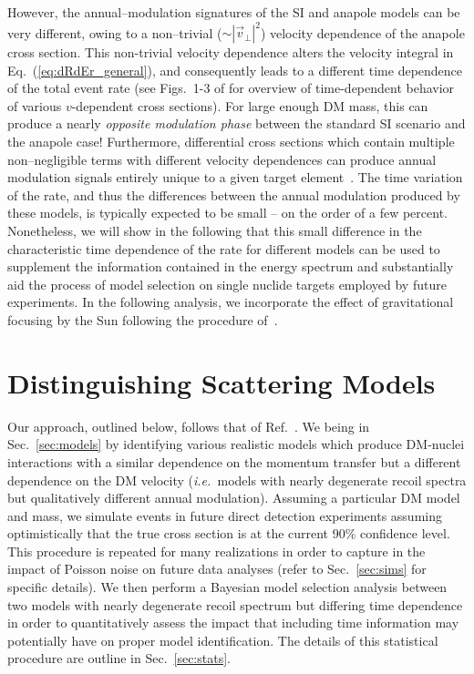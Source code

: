 \documentclass[11pt]{article}
\newcommand{\ie}{{\it i.e.~}}  \newcommand{\eg}{{\it e.g.~}}
\newcommand{\Eq}[1]{Eq.~(\ref{#1})} \newcommand{\Eqs}[2]{Eqs.~(\ref{#1}) and (\ref{#2})} \newcommand{\Eqm}[2]{Eqs.~(\ref{#1}) through (\ref{#2})}
\newcommand{\Sec}[1]{Sec.~\ref{#1}} \newcommand{\Secs}[2]{Secs.~\ref{#1} and \ref{#2}} \newcommand{\Secm}[2]{Secs.~\ref{#1} through \ref{#2}}
\begin{document}
However, the annual--modulation signatures of the SI and anapole models can be very different, owing to a non--trivial ($\sim | \vec v_\perp|^2$) velocity dependence of the anapole cross section. This non-trivial velocity dependence alters the velocity integral in \Eq{eq:dRdEr_general}, and consequently leads to a different time dependence of the total event rate (see Figs.~1-3 of \cite{DelNobile:2015rmp} for overview of time-dependent behavior of various $v$-dependent cross sections). For large enough DM mass, this can produce a nearly {\it opposite modulation phase} between the standard SI scenario and the anapole case! Furthermore, differential cross sections which contain multiple non--negligible terms with different velocity dependences can produce annual modulation signals entirely unique to a given target element~\cite{DelNobile:2015tza,DelNobile:2015rmp}. The time variation of the rate, and thus the differences between the annual modulation produced by these models, is typically expected to be small -- on the order of a few percent. Nonetheless, we will show in the following that this small difference in the characteristic time dependence of the rate for different models can be used to supplement the information contained in the energy spectrum and substantially aid the process of model selection on single nuclide targets employed by future experiments. In the following analysis, we incorporate the effect of gravitational focusing by the Sun following the procedure of~\cite{Lee:2013wza}. 


\section{Distinguishing Scattering Models}\label{sec:procedure}
Our approach, outlined below, follows that of Ref.~\cite{Gluscevic:2015sqa}. We being in Sec.~\ref{sec:models} by identifying various realistic models which produce DM-nuclei interactions with a similar dependence on the momentum transfer but a different dependence on the DM velocity (\ie models with nearly degenerate recoil spectra but qualitatively different annual modulation). Assuming a particular DM model and mass, we simulate events in future direct detection experiments assuming optimistically that the true cross section is at the current 90\% confidence level. This procedure is repeated for many realizations in order to capture in the impact of Poisson noise on future data analyses (refer to \Sec{sec:sims} for specific details). We then perform a Bayesian model selection analysis between two models with nearly degenerate recoil spectrum but differing time dependence in order to quantitatively assess the impact that including time information may potentially have on proper model identification. The details of this statistical procedure are outline in \Sec{sec:stats}.
 
\end{document}
